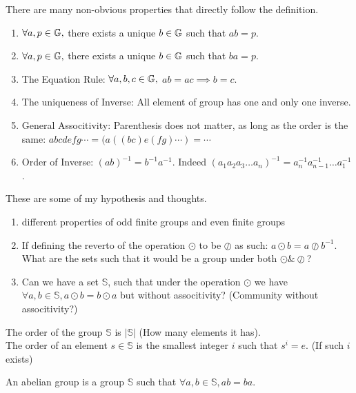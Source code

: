 \documentclass[../note.tex]{subfiles}
\begin{document}
\begin{theorem}
There are many non-obvious properties that directly follow the definition.
\begin{enumerate}
	\item $\forall a, p \in \mathbb{G},$ there exists a unique $b \in \mathbb{G}$ such that $a b = p$.
	\item $\forall a, p \in \mathbb{G},$ there exists a unique $b \in \mathbb{G}$ such that $b a = p$.
	\item The Equation Rule: $\forall a, b, c \in \mathbb{G},$ $a b = a c \implies b = c$.
	\item The uniqueness of Inverse: All element of group has one and only one inverse.
	\item General Associtivity: Parenthesis does not matter, as long as the order is the same: 
		$a b c d e f g \cdots  = (a ((b c) e (f g)\cdots) = \cdots$
	\item Order of Inverse: $(a b)^{-1}=b^{-1}a^{-1}$. Indeed $(a_1a_2a_3\dots a_n)^{-1} = a_n^{-1}a_{n-1}^{-1}\dots a_1^{-1}$.
\end{enumerate}
\end{theorem}

\begin{hypothesis}
	These are some of my hypothesis and thoughts.
	\begin{enumerate}
		\item different properties of odd finite groups and even finite groups
		\item If defining the reverto of the operation $\odot $ to be $\oslash $ as such: $a \odot b = a \oslash b^{-1}$. What are the sets such that it would be a group under both $\odot \& \oslash$?
		\item Can we have a set $\mathbb{S}$, such that under the operation $\odot $ we have $\forall a, b \in \mathbb{S}, a \odot b = b \odot  a$ but without associtivity? (Community without associtivity?)
	\end{enumerate}
\end{hypothesis}
\begin{definition}
The order of the group $\mathbb{S}$ is $|\mathbb{S}|$ (How many elements it has). \\
The order of an element $s \in \mathbb{S}$ is the smallest integer $i$ such that $s^i = e.$ (If such $i$ exists)
\end{definition}

\begin{definition}
	An abelian group is a group $\mathbb{S}$ such that $\forall a, b \in \mathbb{S}, a  b = b  a$.
\end{definition}
\end{document}
